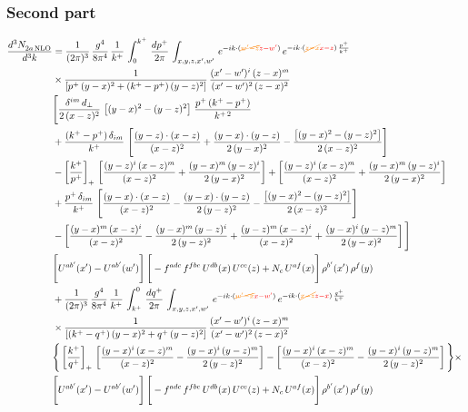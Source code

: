 \documentclass[9pt]{article}
\numberwithin{equation}{section}
\begin{document}
\subsubsection*{Second part}
\begin{align}
    \frac{d^{3}N_{2a\,\rm NLO}^{\rm}}{d^{3}k}  & =  \frac{1}{(2\pi)^{3}}\, \frac{g^{4}}{8\pi^{4}}\,\frac{1}{k^{+}}\,\int_{0}^{k^{+}}\, \frac{dp^{+}}{2\pi}\,\int_{x,y,z,x',w'}\, e^{-ik\cdot({\color{orange}\cancel{w'-z}}{\color{red}z-w'})}\,e^{-ik\cdot ({\color{orange}\cancel{z-x}}{\color{red}x-z})\,\frac{p^{+}}{k^{+}}}\notag \\ & \times\frac{1}{\left[p^{+}\,(y-x)^{2}+(k^{+}-p^{+})\,(y-z)^{2}\right]}\, \frac{(x'-w')^{i}\,(z-x)^{m}}{(x'-w')^{2}\,(z-x)^{2}} \notag \\ & \Bigg[\frac{\delta^{im}\,d_{\perp}}{2\,(x-z)^{2}}\,\left[(y-x)^{2}-(y-z)^{2}\right]\,\frac{p^{+}\,(k^{+}-p^{+})}{k^{+\,2}}\notag \\ & +\frac{(k^{+}-p^{+})\,\delta_{im}}{k^{+}}\,\left[\frac{(y-z)\cdot (x-z)}{(x-z)^{2}}+\frac{(y-x)\cdot (y-z)}{2\,(y-x)^{2}}-\frac{\left[(y-x)^{2}-(y-z)^{2}\right]}{2\,(x-z)^{2}}\right]\notag \\ & -\left[\frac{k^{+}}{p^{+}}\right]_{+}\,\left[\frac{(y-z)^{i}\,(x-z)^{m}}{(x-z)^{2}}+\frac{(y-x)^{m}\,(y-z)^{i}}{2\,(y-x)^{2}}\right]+ \left[\frac{(y-z)^{i}\,(x-z)^{m}}{(x-z)^{2}}+\frac{(y-x)^{m}\,(y-z)^{i}}{2\,(y-x)^{2}}\right]\notag \\ & +\frac{p^{+}\,\delta_{im}}{k^{+}}\,\left[\frac{(y-x)\cdot (x-z)}{(x-z)^{2}}-\frac{(y-x)\cdot (y-z)}{2\,(y-z)^{2}}-\frac{\left[(y-x)^{2}-(y-z)^{2}\right]}{2\,(x-z)^{2}}\right]\notag \\ &-\left[\frac{(y-x)^{m}\,(x-z)^{i}}{(x-z)^{2}}-\frac{(y-x)^{m}\,(y-z)^{i}}{2\,(y-z)^{2}}+\frac{(y-z)^{m}\,(x-z)^{i}}{(x-z)^{2}}+\frac{(y-x)^{i}\,(y-z)^{m}}{2\,(y-x)^{2}}\right]\Bigg] \notag \\ & \Bigg[U^{ab'}(x')-U^{ab'}(w')\Bigg]\,\Bigg[-f^{adc}\,f^{fbe}\,U^{db}(x)\,U^{ce}(z)+N_{c}\,U^{af}(x)\Bigg]\,\rho^{b'}(x')\,\rho^{f}(y)\notag \\ & + \frac{1}{(2\pi)^{3}}\,\frac{g^{4}}{8\pi^{4}}\,\frac{1}{k^{+}}\, \int^{0}_{k^{+}}\, \frac{dq^{+}}{2\pi} \,  \int_{x,y,z,x',w'}\,e^{-ik\cdot({\color{orange}\cancel{w'-x}}{\color{red}x-w'})}\,e^{-ik\cdot ({\color{orange}\cancel{x-z}}{\color{red}z-x})\,\frac{q^{+}}{k^{+}}}\notag \\ & \times\frac{1}{\left[(k^{+}-q^{+})\,(y-x)^{2}+q^{+}\,(y-z)^{2}\right]}\, \frac{(x'-w')^{i}\,(z-x)^{m}}{(x'-w')^{2}\,(z-x)^{2}} \notag \\ &\Bigg\{\left[\frac{k^{+}}{q^{+}}\right]_{+}\,\left[\frac{(y-x)^{i}\,(x-z)^{m}}{(x-z)^{2}}-\frac{(y-x)^{i}\,(y-z)^{m}}{2\,(y-z)^{2}}\right] -\left[\frac{(y-x)^{i}\,(x-z)^{m}}{(x-z)^{2}}-\frac{(y-x)^{i}\,(y-z)^{m}}{2\,(y-z)^{2}}\right]\Bigg\}\times\,\notag \\ & \Bigg[U^{ab'}(x')-U^{ab'}(w')\Bigg]\,\Bigg[-f^{adc}\,f^{fbe}\,U^{db}(x)\,U^{ce}(z)+N_{c}\,U^{af}(x)\Bigg]\,\rho^{b'}(x')\,\rho^{f}(y)
\end{align} 
\end{document}
